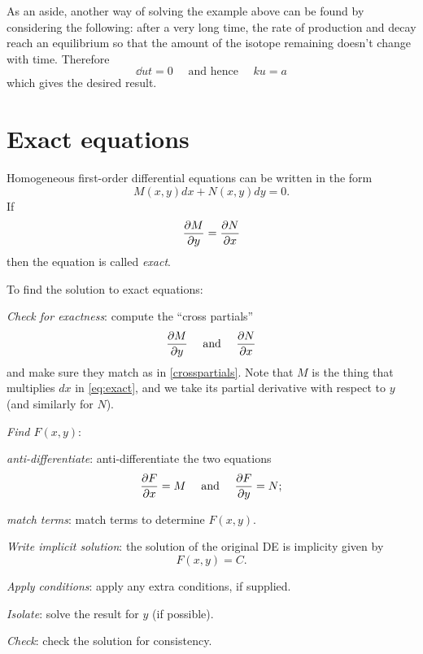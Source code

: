 \documentclass{book}
\begin{document}
As an aside, another way of solving the example above can be found by
considering the following: after a very long time, the rate of
production and decay reach an equilibrium so that the amount of the
isotope remaining doesn't change with time.  Therefore
\begin{equation*}
  \dd{u}{t} = 0 \quad \text{ and hence } \quad k u = a
\end{equation*}
which gives the desired result.



\newpage
\section{Exact equations}

Homogeneous first-order differential equations can be written in the form
\begin{dmath}
  \label{eq:exact}
  M(x,y) dx + N(x,y) dy = 0.
\end{dmath}
If
\begin{dmath}
  \label{crosspartials}
  \pp{M}{y} = \pp{N}{x}
\end{dmath}
then the equation is called \emph{exact}.

To find the solution to exact equations:
\begin{enumerate*}
\item \emph{Check for exactness}: compute the ``cross partials''
  \begin{equation*}
    \frac{\partial M}{\partial y} \quad \text{ and } \quad \frac{\partial N}{\partial x}
  \end{equation*}
  and make sure they match as in \eqref{crosspartials}.  Note that $M$
  is the thing that multiplies $dx$ in \eqref{eq:exact}, and we take
  its partial derivative with respect to $y$ (and similarly for $N$).
\item \emph{Find $F(x,y)$}:
  \begin{enumerate*}
  \item \emph{anti-differentiate}: anti-differentiate the two equations
    \begin{equation*}
      \frac{\partial F}{\partial x} = M \quad \text{ and } \quad \frac{\partial F}{\partial y} = N;
    \end{equation*}
  \item \emph{match terms}: match terms to determine $F(x,y)$.
  \end{enumerate*}
\item \emph{Write implicit solution}: the solution of the original DE is implicity given by
  \begin{equation*}
    F(x,y) = C.
  \end{equation*}
\item \emph{Apply conditions}: apply any extra conditions, if supplied.
\item \emph{Isolate}: solve the result for $y$ (if possible).
\item \emph{Check}: check the solution for consistency.
\end{enumerate*}
\end{document}
